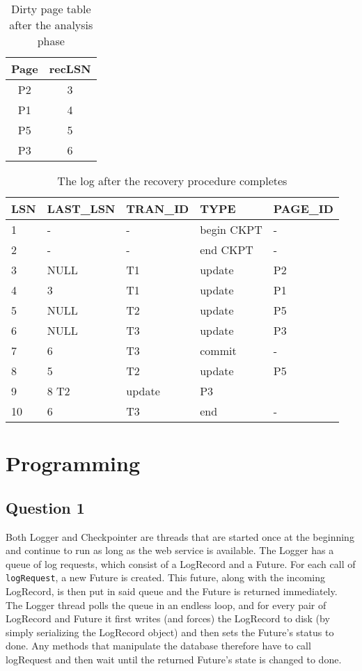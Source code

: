 \documentclass[12pt,a4paper]{article}
\begin{document}
\begin{table}
  \begin{tabular}{c|c}
  Page & recLSN \\ \hline
  P2 & 3 \\
  P1 & 4 \\
  P5 & 5 \\
  P3 & 6 
  \end{tabular}
  \caption{Dirty page table after the analysis phase}
  \label{tab:dirty}
\end{table}

\begin{table}
  \begin{tabular}{l | l | l | l | l}
  LSN & LAST\_LSN & TRAN\_ID & TYPE & PAGE\_ID \\ \hline
  1 & - & - & begin CKPT & - \\
  2 & - & - & end CKPT & - \\
  3 & NULL & T1 & update & P2 \\
  4 & 3 & T1 & update & P1 \\
  5 & NULL & T2 & update & P5 \\
  6 & NULL & T3 & update & P3 \\
  7 & 6 & T3 & commit & - \\
  8 & 5 & T2 & update & P5 \\
  9 & 8 T2 & update & P3 \\
  10 & 6 & T3 & end & - 
    
  \end{tabular}
  \caption{The log after the recovery procedure completes}
  \label{tab:after}
\end{table}


\section*{Programming} 
\label{sec:programming}

\subsection*{Question 1}
\label{sec:pq1}

Both Logger and Checkpointer are threads that are started once at the beginning and continue to run as long as the web service is available. The Logger has a queue of log requests, which consist of a LogRecord and a Future. For each call of \texttt{logRequest}, a new Future is created. This future, along with the incoming LogRecord, is then put in said queue and the Future is returned immediately. The Logger thread polls the queue in an endless loop, and for every pair of LogRecord and Future it first writes (and forces) the LogRecord to disk (by simply serializing the LogRecord object) and then sets the Future's status to done. Any methods that manipulate the database therefore have to call logRequest and then wait until the returned Future's state is changed to done.
\end{document}
